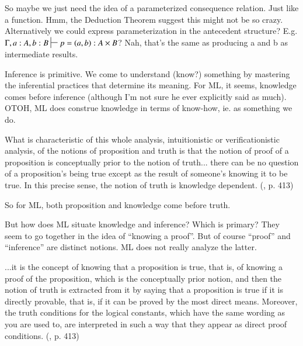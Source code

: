 So maybe we just need the idea of a parameterized consequence
relation. Just like a function. Hmm, the Deduction Theorem suggest
this might not be so crazy. Alternatively we could express
parameterization in the antecedent structure? E.g.
\(\Gamma,a:A,b:B\sststile{}{} p=(a,b): A\times B\)? Nah, that's the
same as producing a and b as intermediate results.


Inference is primitive. We come to understand (know?) something by
mastering the inferential practices that determine its meaning. For
ML, it seems, knowledge comes before inference (although I'm not sure
he ever explicitly said as much). OTOH, ML does construe knowledge in
terms of know-how, ie. as something we do.

\begin{displayquote}
What is characteristic of this whole analysis, intuitionistic or
verificationistic analysis, of the notions of proposition and truth is
that the notion of proof of a proposition is conceptually prior to the
notion of truth... there can be no question of a proposition's being
true except as the result of someone's knowing it to be true. In this
precise sense, the notion of truth is knowledge dependent.
(\parencite{martin1987truth}, p. 413)
\end{displayquote}

So for ML, both proposition and knowledge come before truth.

But how does ML situate knowledge and inference? Which is primary?
They seem to go together in the idea of ``knowing a proof''. But of
course ``proof'' and ``inference'' are distinct notions. ML does not
really analyze the latter.

\begin{displayquote}
...it is the concept of knowing that a proposition is true, that is, of
knowing a proof of the proposition, which is the conceptually prior
notion, and then the notion of truth is extracted from it by saying
that a proposition is true if it is directly provable, that is, if it
can be proved by the most direct means. Moreover, the truth conditions
for the logical constants, which have the same wording as you are used
to, are interpreted in such a way that they appear as direct proof
conditions.
(\parencite{martin1987truth}, p. 413)
\end{displayquote}


